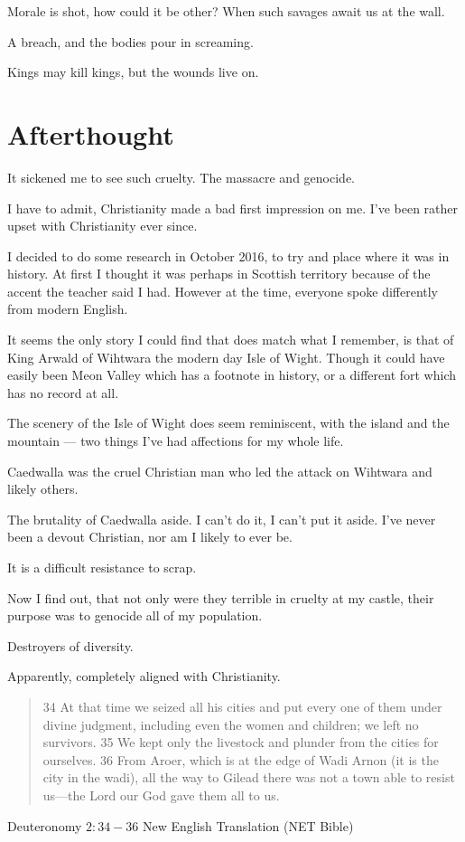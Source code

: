 Morale is shot, how could it be other? When such savages await us at the wall.

A breach, and the bodies pour in screaming. 

Kings may kill kings, but the wounds live on. 
\section{Afterthought}

It sickened me to see such cruelty. The massacre and genocide. 

I have to admit, Christianity made a bad first impression on me. 
I've been rather upset with Christianity ever since. 

I decided to do some research in October 2016, to try and place where it was in
history. At first I thought it was perhaps in Scottish territory because of the
accent the teacher said I had. However at the time, everyone spoke differently
from modern English. 

It seems the only story I could find that does match what I remember, is that of
King Arwald of Wihtwara the modern day Isle of Wight.  
Though it could have easily been Meon Valley which has a footnote in history, 
or a different fort which has no record at all. 

The scenery of the Isle of Wight does seem reminiscent, with the island and the
mountain --- two things I've had affections for my whole life. 

Caedwalla was the cruel Christian man who led the attack on Wihtwara and likely
others.

The brutality of Caedwalla aside. I can't do it, I can't put it aside. 
I've never been a devout Christian, nor am I likely to ever be. 

It is a difficult resistance to scrap. 

Now I find out, that not only were they terrible in cruelty at my castle,
their purpose was to genocide all of my population.

Destroyers of diversity. 

Apparently, completely aligned with Christianity. 

\blockquote{34 At that time we seized all his cities and put every one of them 
under divine judgment, including even the women and children; we left no 
survivors. 35 We kept only the livestock and plunder from the cities for 
ourselves. 36 From Aroer, which is at the edge of Wadi Arnon (it is the city in
 the wadi), all the way to Gilead there was not a town able to resist us—the 
Lord our God gave them all to us.}{Deuteronomy $2:34-36$ New English Translation
(NET Bible)}
 
